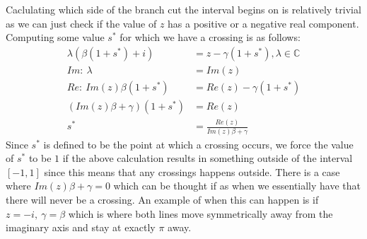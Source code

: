 \documentclass{article}
\begin{document}
Caclulating which side of the branch cut the interval begins on is relatively trivial as we can just check if the value of $z$ has a positive or a negative real component.
Computing some value $s^*$ for which we have a crossing is as follows:
\begin{align}
    \lambda(\beta(1+s^*)+i)&=z-\gamma(1+s^*),\lambda\in\mathbb{C}\\
    Im:\:\lambda&=Im(z)\\
    Re:\:Im(z)\beta(1+s^*)&=Re(z)-\gamma(1+s^*)\\
    (Im(z)\beta+\gamma)(1+s^*)&=Re(z)\\
    s^*&=\frac{Re(z)}{Im(z)\beta+\gamma}
\end{align}
Since $s^*$ is defined to be the point at which a crossing occurs, we force the value of $s^*$ to be $1$ if the above calculation results in something outside of the interval $[-1,1]$ since this means that any crossings happens outside.
There is a case where $Im(z)\beta+\gamma=0$ which can be thought if as when we essentially have that there will never be a crossing.
An example of when this can happen is if $z=-i,\:\gamma=\beta$ which is where both lines move symmetrically away from the imaginary axis and stay at exactly $\pi$ away.
\end{document}
